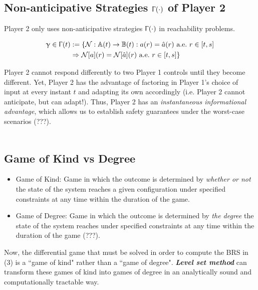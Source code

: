 \documentclass{article}
\begin{document}
\subsection{Non-anticipative Strategies $\Upgamma(\cdot)$ of Player 2}
\quad Player 2 only uses non-anticipative strategies $\Upgamma(\cdot)$ in reachability problems.

\begin{equation}
    \begin{aligned}
    \upgamma \in \Upgamma(t) & := \{\mathcal{N} : \mathbb{A}(t) \rightarrow \mathbb{B}(t) : a(r) = \hat{a}(r) \ \text{a.e.} \ r \in [t,s] \\
    & \Rightarrow \mathcal{N}[a](r) = \mathcal{N}[\hat{a}](r) \ \text{a.e.} \ r \in [t,s]\}
    \end{aligned}
\end{equation}

Player 2 cannot respond differently to two Player 1 controls until they become different. Yet, Player 2 has the advantage of factoring in Player 1's choice of input at every instant $t$ and adapting its own accordingly (i.e. Player 2 cannot anticipate, but can adapt!). Thus, Player 2 has an \textit{instantaneous informational advantage}, which allows us to establish safety guarantees under the worst-case scenarios (???). \\
\\

\subsection{Game of Kind vs Degree}
\begin{itemize}
    \item Game of Kind: Game in which the outcome is determined by \textit{whether or not} the state of the system reaches a given configuration under specified constraints at any time within the duration of the game.
    \item Game of Degree: Game in which the outcome is determined by \textit{the degree} the state of the system reaches under specified constraints at any time within the duration of the game (???).
\end{itemize} 

\quad Now, the differential game that must be solved in order to compute the BRS in (3) is a ``game of kind" rather than a ``game of degree".
\textit{\textbf{Level set method}} can transform these games of kind into games of degree in an analytically sound and computationally tractable way.
\end{document}
